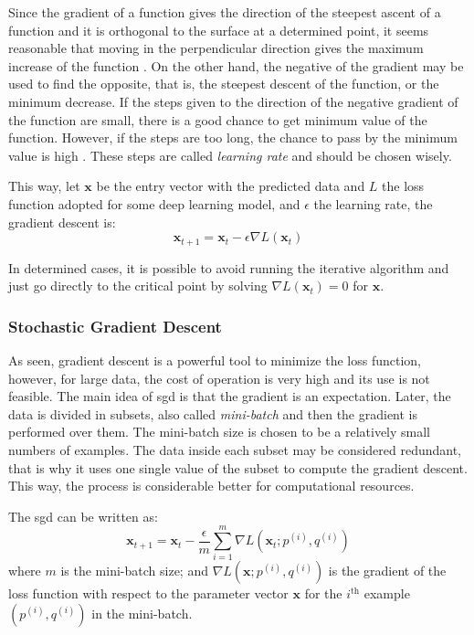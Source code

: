 Since the gradient of a function gives the direction of the steepest ascent of a function and it is orthogonal to the surface at a determined point, it seems reasonable that moving in the perpendicular direction gives the maximum increase of the function \citep{stewart2016}.
On the other hand, the negative of the gradient may be used to find the opposite, that is, the steepest descent of the function, or the minimum decrease.
If the steps given to the direction of the negative gradient of the function are small, there is a good chance to get minimum value of the function.
However, if the steps are too long, the chance to pass by the minimum value is high \citep{nielsen2015}.
These steps are called \emph{learning rate} and should be chosen wisely.

This way, let \(\symbf{x}\) be the entry vector with the predicted data and \(L\) the loss function adopted for some deep learning model, and \(\epsilon\) the learning rate, the gradient descent is:
%
\begin{equation}
    \symbf{x}_{t+1} = \symbf{x}_t - \epsilon \nabla L(\symbf{x}_t)
\end{equation}

In determined cases, it is possible to avoid running the iterative algorithm and just go directly to the critical point by solving \(\nabla L(\symbf{x}_t) = 0\) for \(\symbf{x}\).

\subsubsection*{Stochastic Gradient Descent}

As seen, gradient descent is a powerful tool to minimize the loss function, however, for large data, the cost of operation is very high and its use is not feasible. 
The main idea of \gls*{sgd} is that the gradient is an expectation.
Later, the data is divided in subsets, also called \emph{mini-batch} and then the gradient is performed over them.
The mini-batch size is chosen to be a relatively small numbers of examples.
The data inside each subset may be considered redundant, that is why it uses one single value of the subset to compute the gradient descent.
This way, the process is considerable better for computational resources.

The \gls*{sgd} can be written as:
%
\begin{equation}
    \symbf{x}_{t+1} = \symbf{x}_t - \frac{\epsilon}{m} \sum_{i=1}^m \nabla L(\symbf{x}_t; p^{(i)},q^{(i)})
\end{equation}
%
where \(m\)  is the mini-batch size; and \(\nabla L(\symbf{x}; p^{(i)}, q^{(i)})\) is the gradient of the loss function with respect to the parameter vector \(\symbf{x}\) for the \(i^{\text{th}}\) example \((p^{(i)}, q^{(i)})\) in the mini-batch.

